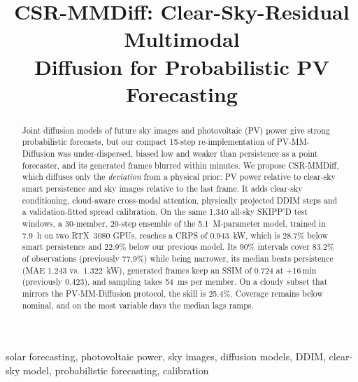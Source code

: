 \documentclass[conference]{IEEEtran}
\begin{document}

\title{CSR-MMDiff: Clear-Sky-Residual Multimodal\\Diffusion for Probabilistic PV Forecasting}

\author{
}

\maketitle

\begin{abstract}
Joint diffusion models of future sky images and photovoltaic (PV) power give strong probabilistic forecasts, but our compact 15-step re-implementation of PV-MM-Diffusion was under-dispersed, biased low and weaker than persistence as a point forecaster, and its generated frames blurred within minutes. We propose CSR-MMDiff, which diffuses only the \emph{deviation} from a physical prior: PV power relative to clear-sky smart persistence and sky images relative to the last frame. It adds clear-sky conditioning, cloud-aware cross-modal attention, physically projected DDIM steps and a validation-fitted spread calibration. On the same 1{,}340 all-sky SKIPP'D test windows, a 30-member, 20-step ensemble of the \SI{5.1}{M}-parameter model, trained in \SI{7.9}{h} on two RTX~3080 GPUs, reaches a CRPS of \SI{0.943}{kW}, which is 28.7\% below smart persistence and 22.9\% below our previous model. Its 90\% intervals cover 83.2\% of observations (previously 77.9\%) while being narrower, its median beats persistence (MAE 1.243 vs.\ \SI{1.322}{kW}), generated frames keep an SSIM of 0.724 at +16\,min (previously 0.423), and sampling takes \SI{54}{ms} per member. On a cloudy subset that mirrors the PV-MM-Diffusion protocol, the skill is 25.4\%. Coverage remains below nominal, and on the most variable days the median lags ramps.
\end{abstract}

\begin{IEEEkeywords}
solar forecasting, photovoltaic power, sky images, diffusion models, DDIM, clear-sky model, probabilistic forecasting, calibration
\end{IEEEkeywords}
\end{document}
